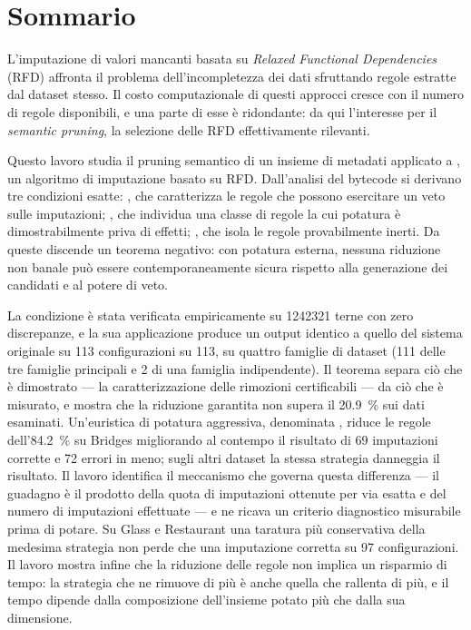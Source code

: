 \chapter*{Sommario}

L'imputazione di valori mancanti basata su \emph{Relaxed Functional Dependencies} (RFD)
affronta il problema dell'incompletezza dei dati sfruttando regole estratte dal dataset stesso.
Il costo computazionale di questi approcci cresce con il numero di regole disponibili, e una
parte di esse è ridondante: da qui l'interesse per il \emph{semantic pruning}, la selezione
delle RFD effettivamente rilevanti.

Questo lavoro studia il pruning semantico di un insieme di metadati applicato a \renuver{}, un
algoritmo di imputazione basato su RFD. Dall'analisi del bytecode si derivano tre condizioni
esatte: \Vone{}, che caratterizza le regole che possono esercitare un veto sulle imputazioni;
\Vtwo{}, che individua una classe di regole la cui potatura è dimostrabilmente priva di effetti;
\Vthree{}, che isola le regole provabilmente inerti. Da queste discende un teorema negativo: con
potatura esterna, nessuna riduzione non banale può essere contemporaneamente sicura rispetto alla
generazione dei candidati e al potere di veto.

La condizione \Vtwo{} è stata verificata empiricamente su \num{1242321} terne con zero
discrepanze, e la sua applicazione produce un output identico a quello del sistema originale su
\num{113} configurazioni su \num{113}, su quattro famiglie di dataset (\num{111} delle tre
famiglie principali e \num{2} di una famiglia indipendente). Il teorema separa ciò che è
dimostrato --- la caratterizzazione delle rimozioni certificabili --- da ciò che è misurato, e
mostra che la riduzione garantita non supera il \SI{20.9}{\percent} sui dati esaminati. Un'euristica di potatura
aggressiva, denominata , riduce le regole dell'\SI{84.2}{\percent} su Bridges migliorando
al contempo il risultato di \num{69} imputazioni corrette e \num{72} errori in meno; sugli altri
dataset la stessa strategia danneggia il risultato. Il lavoro identifica il meccanismo che governa
questa differenza --- il guadagno è il prodotto della quota di imputazioni ottenute per via esatta
e del numero di imputazioni effettuate --- e ne ricava un criterio diagnostico misurabile prima di
potare. Su Glass e Restaurant una taratura più conservativa della medesima strategia non perde che
una imputazione corretta su \num{97} configurazioni. Il lavoro mostra infine che la riduzione
delle regole non implica un risparmio di tempo: la strategia che ne rimuove di più è anche quella
che rallenta di più, e il tempo dipende dalla composizione dell'insieme potato più che dalla sua
dimensione.
